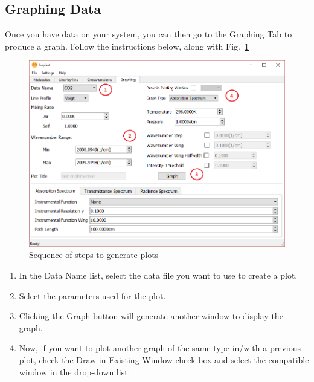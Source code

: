 \documentclass[12pt]{article}
\begin{document}
\subsection{Graphing Data}
Once you have data on your system, you can then go to the Graphing Tab to produce a graph. Follow the instructions below, along with Fig.~\ref{fig:how_to_graph}
\begin{figure}[h]
\centering
\includegraphics[scale = 0.6]{hapiest_graphing_guide}
\caption{Sequence of steps to generate plots}
\label{fig:how_to_graph}
\end{figure}
\begin{enumerate}
\item In the Data Name list, select the data file you want to use to create a plot.
\item Select the parameters used for the plot.
\item Clicking the Graph button will generate another window to display the graph.
\item Now, if you want to plot another graph of the same type in/with a previous plot, check the Draw in Existing Window check box and select the compatible window in the drop-down list.
\end{enumerate}
\end{document}
